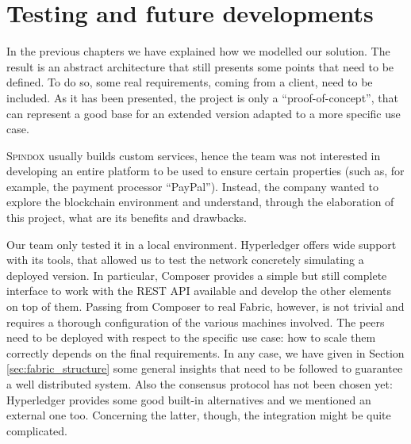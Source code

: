 \chapter{Testing and future developments}
\label{cha:future}

In the previous chapters we have explained how we modelled our solution. The result is an abstract architecture that still presents some points that need to be defined. To do so, some real requirements, coming from a client, need to be included. As it has been presented, the project is only a ``proof-of-concept'', that can represent a good base for an extended version adapted to a more specific use case.

\textsc{Spindox} usually builds custom services, hence the team was not interested in developing an entire platform to be used to ensure certain properties (such as, for example, the payment processor ``PayPal''). Instead, the company wanted to explore the blockchain environment and understand, through the elaboration of this project, what are its benefits and drawbacks. 

Our team only tested it in a local environment. Hyperledger offers wide support with its tools, that allowed us to test the network concretely simulating a deployed version. In particular, Composer provides a simple but still complete interface to work with the REST API available and develop the other elements on top of them. Passing from Composer to real Fabric, however, is not trivial and requires a thorough configuration of the various machines involved. The peers need to be deployed with respect to the specific use case: how to scale them correctly depends on the final requirements. In any case, we have given in Section \ref{sec:fabric_structure} some general insights that need to be followed to guarantee a well distributed system. Also the consensus protocol has not been chosen yet: Hyperledger provides some good built-in alternatives and we mentioned an external one too. Concerning the latter, though, the integration might be quite complicated.

